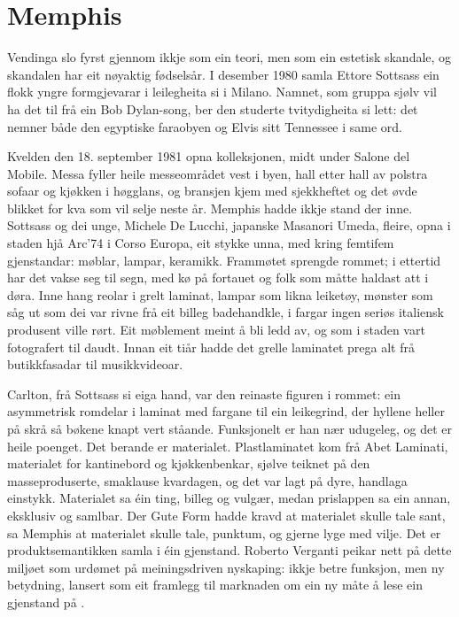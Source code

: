 \section{Memphis}

Vendinga slo fyrst gjennom ikkje som ein teori, men som ein estetisk skandale, og skandalen har eit nøyaktig fødselsår. I desember 1980 samla Ettore Sottsass ein flokk yngre formgjevarar i leilegheita si i Milano. Namnet, som gruppa sjølv vil ha det til frå ein Bob Dylan-song, ber den studerte tvitydigheita si lett: det nemner både den egyptiske faraobyen og Elvis sitt Tennessee i same ord.

Kvelden den 18. september 1981 opna kolleksjonen, midt under Salone del Mobile. Messa fyller heile messeområdet vest i byen, hall etter hall av polstra sofaar og kjøkken i høgglans, og bransjen kjem med sjekkheftet og det øvde blikket for kva som vil selje neste år. Memphis hadde ikkje stand der inne. Sottsass og dei unge, Michele De Lucchi, japanske Masanori Umeda, fleire, opna i staden hjå Arc'74 i Corso Europa, eit stykke unna, med kring femtifem gjenstandar: møblar, lampar, keramikk. Frammøtet sprengde rommet; i ettertid har det vakse seg til segn, med kø på fortauet og folk som måtte haldast att i døra. Inne hang reolar i grelt laminat, lampar som likna leiketøy, mønster som såg ut som dei var rivne frå eit billeg badehandkle, i fargar ingen seriøs italiensk produsent ville rørt. Eit møblement meint å bli ledd av, og som i staden vart fotografert til daudt. Innan eit tiår hadde det grelle laminatet prega alt frå butikkfasadar til musikkvideoar.

Carlton, frå Sottsass si eiga hand, var den reinaste figuren i rommet: ein asymmetrisk romdelar i laminat med fargane til ein leikegrind, der hyllene heller på skrå så bøkene knapt vert ståande. Funksjonelt er han nær udugeleg, og det er heile poenget. Det berande er materialet. Plastlaminatet kom frå Abet Laminati, materialet for kantinebord og kjøkkenbenkar, sjølve teiknet på den masseproduserte, smaklause kvardagen, og det var lagt på dyre, handlaga einstykk. Materialet sa éin ting, billeg og vulgær, medan prislappen sa ein annan, eksklusiv og samlbar. Der Gute Form hadde kravd at materialet skulle tale sant, sa Memphis at materialet skulle tale, punktum, og gjerne lyge med vilje. Det er produktsemantikken samla i éin gjenstand. Roberto Verganti peikar nett på dette miljøet som urdømet på meiningsdriven nyskaping: ikkje betre funksjon, men ny betydning, lansert som eit framlegg til marknaden om ein ny måte å lese ein gjenstand på \autocite{verganti2009}.

